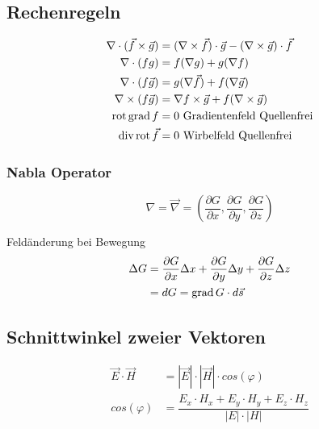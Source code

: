 \subsection{Rechenregeln}
\begin{align*}
    \nabla \cdot ( \vec{f} \times \vec{g}) & = ( \nabla \times \vec{f}) \cdot \vec{g} - ( \nabla \times \vec{g}) \cdot \vec{f} \\
    \nabla \cdot (fg)                      & = f( \nabla g) + g( \nabla f)                                                     \\
    \nabla \cdot (f \vec{g} )              & = g( \nabla \vec{f}) + f( \nabla \vec{g})                                         \\
    \nabla \times (f \vec{g})              & = \nabla f \times \vec{g} + f( \nabla \times \vec{g} )                            \\
    \operatorname{rot} \operatorname{grad} f                       & = 0 \textnormal{ Gradientenfeld Quellenfrei}                                      \\
    \operatorname{div} \operatorname{rot} \vec{f}                  & = 0 \textnormal{ Wirbelfeld Quellenfrei}
\end{align*}


\subsubsection*{Nabla Operator}
\[
    \nabla = \vec{\nabla} = \left( \dfrac{\partial G}{\partial x},
    \dfrac{\partial G}{\partial y}, \dfrac{\partial G}{\partial z} \right)
\]

Feldänderung bei Bewegung
\begin{align*}
    \Delta G & = \dfrac{\partial G}{\partial x} \Delta x + \dfrac{\partial G}{\partial y} \Delta y + \dfrac{\partial G}{\partial z} \Delta z \\
             & = dG = \operatorname{grad} G \cdot d \vec{s}
\end{align*}

\subsection{Schnittwinkel zweier Vektoren}
\begin{align*}
    \vec{E} \cdot \vec{H} & = |\vec{E}| \cdot |\vec{H}| \cdot cos(\varphi)                         \\
    cos(\varphi)          & = \dfrac{E_x \cdot H_x + E_y \cdot H_y + E_z \cdot H_z}{|E| \cdot |H|}
\end{align*}

